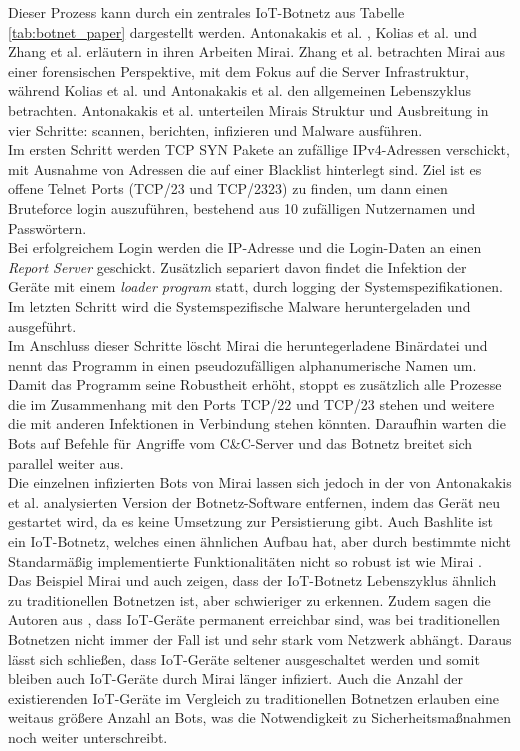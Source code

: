 Dieser Prozess kann durch ein zentrales IoT-Botnetz aus Tabelle \ref{tab:botnet_paper} dargestellt werden. Antonakakis et al. \cite{DBLP:conf/uss/AntonakakisABBB17}, Kolias et al. \cite{DBLP:journals/computer/KoliasKSV17} und Zhang et al. \cite{DBLP:journals/di/ZhangUBC20} erläutern in ihren Arbeiten Mirai. Zhang et al. betrachten Mirai aus einer forensischen Perspektive, mit dem Fokus auf die Server Infrastruktur, während Kolias et al. und Antonakakis et al. den allgemeinen Lebenszyklus betrachten. Antonakakis et al. unterteilen Mirais Struktur und Ausbreitung in vier Schritte: scannen, berichten, infizieren und Malware ausführen. \\ Im ersten Schritt werden TCP SYN Pakete an zufällige IPv4-Adressen verschickt, mit Ausnahme von Adressen die auf einer Blacklist hinterlegt sind. Ziel ist es offene Telnet Ports (TCP/23 und TCP/2323) zu finden, um dann einen Bruteforce login auszuführen, bestehend aus 10 zufälligen Nutzernamen und Passwörtern. \\ Bei erfolgreichem Login werden die IP-Adresse und die Login-Daten an einen \textit{Report Server} geschickt. Zusätzlich separiert davon findet die Infektion der Geräte mit einem \textit{loader program} statt, durch logging der Systemspezifikationen. Im letzten Schritt wird die Systemspezifische Malware heruntergeladen und ausgeführt. \\ Im Anschluss dieser Schritte löscht Mirai die heruntegerladene Binärdatei und nennt das Programm in einen pseudozufälligen alphanumerische Namen um. Damit das Programm seine Robustheit erhöht, stoppt es zusätzlich alle Prozesse die im Zusammenhang mit den Ports TCP/22 und TCP/23 stehen und weitere die mit anderen Infektionen in Verbindung stehen könnten. Daraufhin warten die Bots auf Befehle für Angriffe vom C\&C-Server und das Botnetz breitet sich parallel weiter aus. \\ Die einzelnen infizierten Bots von Mirai lassen sich jedoch in der von Antonakakis et al. analysierten Version der Botnetz-Software entfernen, indem das Gerät neu gestartet wird, da es keine Umsetzung zur Persistierung gibt. Auch Bashlite ist ein IoT-Botnetz, welches einen ähnlichen Aufbau hat, aber durch bestimmte nicht Standarmäßig implementierte Funktionalitäten nicht so robust ist wie Mirai  \cite{DBLP:conf/iscc/MarzanoAFFHSCCG18}.\\[0.2in]

Das Beispiel Mirai und auch \cite{dange2019iot} zeigen, dass der IoT-Botnetz Lebenszyklus ähnlich zu traditionellen Botnetzen ist, aber schwieriger zu erkennen. Zudem sagen die Autoren aus \cite{dange2019iot}, dass IoT-Geräte permanent erreichbar sind, was bei traditionellen Botnetzen nicht immer der Fall ist und sehr stark vom Netzwerk abhängt. Daraus lässt sich schließen, dass IoT-Geräte seltener ausgeschaltet werden und somit bleiben auch IoT-Geräte durch Mirai länger infiziert. Auch die Anzahl der existierenden IoT-Geräte im Vergleich zu traditionellen Botnetzen erlauben eine weitaus größere Anzahl an Bots, was die Notwendigkeit zu Sicherheitsmaßnahmen noch weiter unterschreibt.\\

